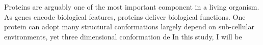 Proteins are arguably one of the most important component in a living organism. As genes encode biological features, proteins deliver biological functions. One protein can adopt many structural conformations largely depend on sub-cellular environments, yet three dimensional conformation de    In this study, I will be 